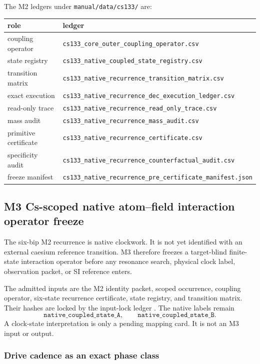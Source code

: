 The M2 ledgers under \texttt{manual/data/cs133/} are:
\begin{center}
\begin{tabular}{@{}ll@{}}
\toprule
role & ledger\\
\midrule
coupling operator & \texttt{cs133\_core\_outer\_coupling\_operator.csv}\\
state registry & \texttt{cs133\_native\_coupled\_state\_registry.csv}\\
transition matrix & \texttt{cs133\_native\_recurrence\_transition\_matrix.csv}\\
exact execution & \texttt{cs133\_native\_recurrence\_dec\_execution\_ledger.csv}\\
read-only trace & \texttt{cs133\_native\_recurrence\_read\_only\_trace.csv}\\
mass audit & \texttt{cs133\_native\_recurrence\_mass\_audit.csv}\\
primitive certificate & \texttt{cs133\_native\_recurrence\_certificate.csv}\\
specificity audit & \texttt{cs133\_native\_recurrence\_counterfactual\_audit.csv}\\
freeze manifest & \texttt{cs133\_native\_recurrence\_pre\_certificate\_manifest.json}\\
\bottomrule
\end{tabular}
\end{center}

\subsection{M3 Cs-scoped native atom--field interaction operator freeze}

The six-bip M2 recurrence is native clockwork. It is not yet identified with
an external caesium reference transition. M3 therefore freezes a target-blind
finite-state interaction operator before any resonance search, physical clock
label, observation packet, or SI reference enters.

The admitted inputs are the M2 identity packet, scoped occurrence, coupling
operator, six-state recurrence certificate, state registry, and transition
matrix. Their hashes are locked by the input-lock ledger
. The native labels remain
\[
\texttt{native\_coupled\_state\_A},
\qquad
\texttt{native\_coupled\_state\_B}.
\]
A clock-state interpretation is only a pending mapping card. It is not an M3
input or output.

\subsubsection{Drive cadence as an exact phase class}

